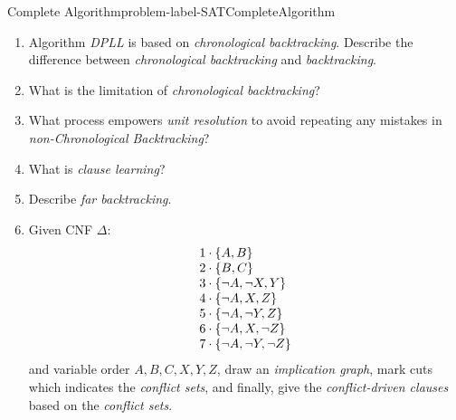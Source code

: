 \documentclass[main.tex]{subfiles}
\begin{document}
\begin{problem}{Complete Algorithm}{problem-label-SATCompleteAlgorithm}
\begin{enumerate}[(1)]
\[    \]
    \item Algorithm \textit{DPLL} is based on \textit{chronological backtracking}. Describe the difference between \textit{chronological backtracking} and \textit{backtracking}.
    \item What is the limitation of \textit{chronological backtracking}?
    \item What process empowers \textit{unit resolution} to avoid repeating any mistakes in \textit{non-Chronological Backtracking}?
    \item What is \textit{clause learning}?
    \item Describe \textit{far backtracking}.
    \item Given CNF $\Delta$:
    \[
        \begin{array}{l l}{1\cdot\{A,B\}}\\ {2\cdot\{B,C\}}\\ {3\cdot\{\lnot A, \lnot X, Y\}}\\{4\cdot\{\lnot A, X, Z\}}\\ {5\cdot\{\lnot A,\lnot Y,Z\}}\\ {6\cdot\{\lnot A, X, \lnot Z\}}\\ {7\cdot\{\lnot A,\lnot Y,\lnot Z\}}\end{array}
    \]
    and variable order $A, B, C, X, Y, Z$, draw an \textit{implication graph}, mark cuts which indicates the \textit{conflict sets}, and finally, give the \textit{conflict-driven clauses} based on the \textit{conflict sets}.
    
\end{enumerate}
\end{problem}
\vspace*{4\baselineskip}

\vspace*{4\baselineskip}
\end{document}
